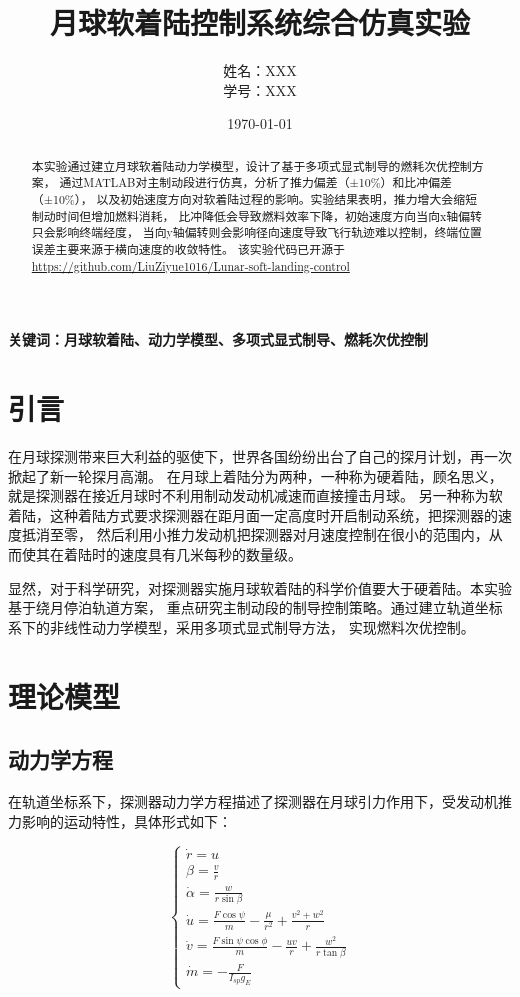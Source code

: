 \documentclass[12pt,a4paper]{article}
\title{月球软着陆控制系统综合仿真实验}
\author{姓名：XXX\\学号：XXX}
\date{\today}
\begin{document}
\maketitle

\begin{abstract}
本实验通过建立月球软着陆动力学模型，设计了基于多项式显式制导的燃耗次优控制方案，
通过MATLAB对主制动段进行仿真，分析了推力偏差（±10\%）和比冲偏差（±10\%），
以及初始速度方向对软着陆过程的影响。实验结果表明，推力增大会缩短制动时间但增加燃料消耗，
比冲降低会导致燃料效率下降，初始速度方向当向x轴偏转只会影响终端经度，
当向y轴偏转则会影响径向速度导致飞行轨迹难以控制，终端位置误差主要来源于横向速度的收敛特性。
该实验代码已开源于\url{https://github.com/LiuZiyue1016/Lunar-soft-landing-control}
\end{abstract}

\textbf{关键词：月球软着陆、动力学模型、多项式显式制导、燃耗次优控制}

\section{引言}
在月球探测带来巨大利益的驱使下，世界各国纷纷出台了自己的探月计划，再一次掀起了新一轮探月高潮。
在月球上着陆分为两种，一种称为硬着陆，顾名思义，就是探测器在接近月球时不利用制动发动机减速而直接撞击月球。
另一种称为软着陆，这种着陆方式要求探测器在距月面一定高度时开启制动系统，把探测器的速度抵消至零，
然后利用小推力发动机把探测器对月速度控制在很小的范围内，从而使其在着陆时的速度具有几米每秒的数量级。

显然，对于科学研究，对探测器实施月球软着陆的科学价值要大于硬着陆。本实验基于绕月停泊轨道方案，
重点研究主制动段的制导控制策略。通过建立轨道坐标系下的非线性动力学模型，采用多项式显式制导方法，
实现燃料次优控制。

\section{理论模型}
\subsection{动力学方程}
在轨道坐标系下，探测器动力学方程描述了探测器在月球引力作用下，受发动机推力影响的运动特性，具体形式如下：

\begin{equation}
\begin{cases}
\dot{r} = u \\
\beta = \frac{v}{r} \\
\dot{\alpha} = \frac{w}{r \sin \beta} \\
\dot{u} = \frac{F \cos \psi}{m} - \frac{\mu}{r^2} + \frac{v^2 + w^2}{r} \\
\dot{v} = \frac{F \sin \psi \cos \phi}{m} - \frac{uv}{r} + \frac{w^2}{r \tan \beta} \\
\dot{m} = -\frac{F}{I_{sp} g_E}
\end{cases}
\end{equation}
\end{document}
